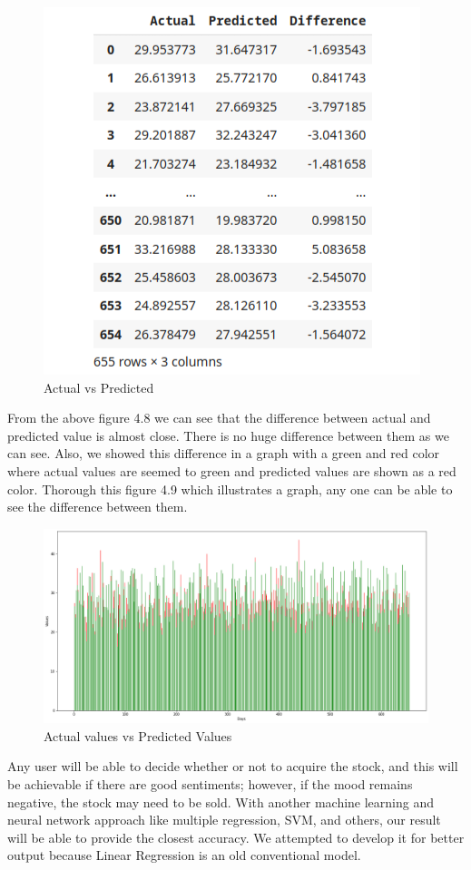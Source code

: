 \begin{figure}[H]
    \centering
    \includegraphics[scale=.6]{img4/result.png}
    \caption{Actual vs Predicted}
    \label{fig:result}
\end{figure}
From the above figure 4.8 we can see that the difference between actual and predicted value is almost close. There is no huge difference between them as we can see. Also, we showed this difference in a graph with a green and red color where actual values are seemed to green and predicted values are shown as a red color. Thorough this figure 4.9 which illustrates a graph, any one can be able to see the difference between them.\\
\begin{figure}[H]
    \centering
    \includegraphics[scale=.35]{img4/Values.png}
    \caption{Actual values vs Predicted Values}
    \label{fig:Actual values vs Predicted Graph}
\end{figure}
Any user will be able to decide whether or not to acquire the stock, and this will be achievable if there are good sentiments; however, if the mood remains negative, the stock may need to be sold. 
With another machine learning and neural network approach like multiple regression, SVM, and others, our result will be able to provide the closest accuracy. We attempted to develop it for better output because Linear Regression is an old conventional model.\\

